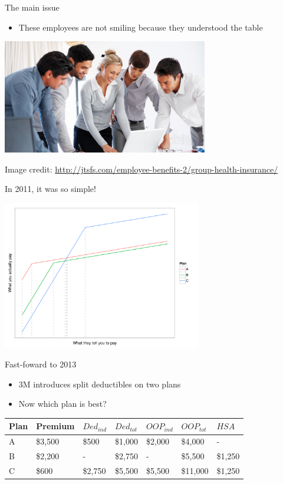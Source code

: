 \documentclass[sans,aspectratio=169,presentation,bigger,fleqn]{beamer}
\begin{document}
\begin{frame}[label=sec-12]{The main issue}
\begin{itemize}
\item These employees are not smiling because they understood the table
\end{itemize}

\begin{center}
\includegraphics[height=5cm]{./img/choosing-insurance.jpg}
\end{center}

\tiny
Image credit: \url{http://jtsfs.com/employee-benefits-2/group-health-insurance/}
\end{frame}
\begin{frame}[label=sec-13]{In 2011, it was so simple!}
\begin{center}
\includegraphics[height=6.5cm]{./img/ins-intersections.pdf}
\end{center}
\end{frame}
\begin{frame}[label=sec-14]{Fast-foward to 2013}
\begin{itemize}
\item 3M introduces split deductibles on two plans
\item Now which plan is best?
\end{itemize}

\footnotesize
\begin{center}
\begin{tabular}{lllllll}
\toprule
Plan & Premium & \(Ded_{ind}\) & \(Ded_{tot}\) & \(OOP_{ind}\) & \(OOP_{tot}\) & \(HSA\)\\
\midrule
A & \$3,500 & \$500 & \$1,000 & \$2,000 & \$4,000 & -\\
B & \$2,200 & - & \$2,750 & - & \$5,500 & \$1,250\\
C & \$600 & \$2,750 & \$5,500 & \$5,500 & \$11,000 & \$1,250\\
\bottomrule
\end{tabular}
\end{center}
\normalsize
\end{frame}
\end{document}
